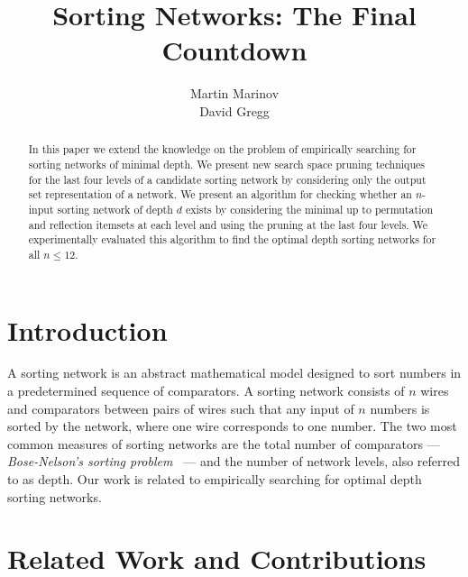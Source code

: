 \documentclass[13pt,a4paper]{article}
\begin{document}
\title{ Sorting Networks: The Final Countdown }
\author{Martin Marinov\\ David Gregg}
\maketitle









\begin{abstract}

In this paper we extend the knowledge on the problem of empirically searching for sorting networks of minimal depth. We present new search space pruning techniques for the last four levels of a candidate sorting network by considering only the output set representation of a network. We present an algorithm for checking whether an $n$-input sorting network of depth $d$ exists by considering the minimal up to permutation and reflection itemsets at each level and using the pruning at the last four levels. We experimentally evaluated this algorithm to find the optimal depth sorting networks for all $n \leq 12$.

\end{abstract}



\section{Introduction}









A sorting network is an abstract mathematical model designed to sort numbers in a predetermined sequence of comparators. A sorting network consists of $n$ wires and comparators between pairs of wires such that any input of $n$ numbers is sorted by the network, where one wire corresponds to one number. The two most common measures of sorting networks are the total number of comparators --- \emph{Bose-Nelson's sorting problem~\cite{Bose:1962:SP}} --- and the number of network levels, also referred to as depth. Our work is related to empirically searching for optimal depth sorting networks.


\section{Related Work and Contributions}
\end{document}
